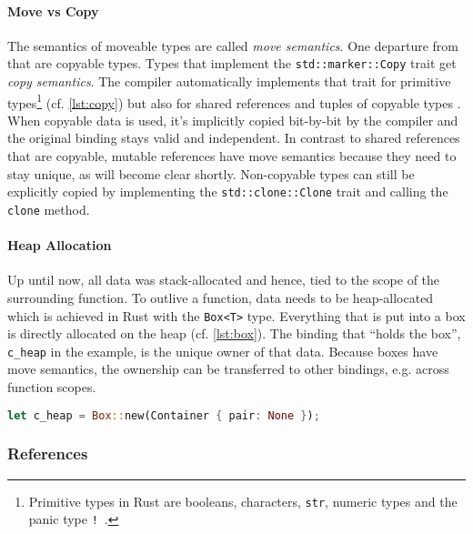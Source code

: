 \paragraph{Move vs Copy}

The semantics of moveable types are called \emph{move semantics}. One departure
from that are copyable types. Types that implement the
\lstinline!std::marker::Copy! trait get \emph{copy semantics}. The compiler
automatically implements that trait for primitive types\footnote{Primitive types
in Rust are booleans, characters, \lstinline!str!, numeric types and the panic
type \texttt{!}~\cite{rustref}.} (cf. \autoref{lst:copy}) but also for shared
references and tuples of copyable types \cite[section "Special types and
traits"]{rustref}. When copyable data is used, it's implicitly copied bit-by-bit
by the compiler and the original binding stays valid and independent. In
contrast to shared references that are copyable, mutable references have move
semantics because they need to stay unique, as will become clear shortly.
Non-copyable types can still be explicitly copied by implementing the
\lstinline!std::clone::Clone! trait and calling the \lstinline!clone! method.

\paragraph{Heap Allocation}

Up until now, all data was stack-allocated and hence, tied to the scope of the
surrounding function. To outlive a function, data needs to be heap-allocated
which is achieved in Rust with the \lstinline!Box<T>! type. Everything that is
put into a box is directly allocated on the heap (cf. \autoref{lst:box}). The
binding that ``holds the box'', \lstinline!c_heap! in the example, is the unique
owner of that data. Because boxes have move semantics, the ownership can be
transferred to other bindings, e.g. across function scopes.

\begin{lstlisting}[language=Rust, label=lst:box, caption={A heap-allocated container.}, style=short]
let c_heap = Box::new(Container { pair: None });
\end{lstlisting}

\subsubsection{References}
\label{references}

